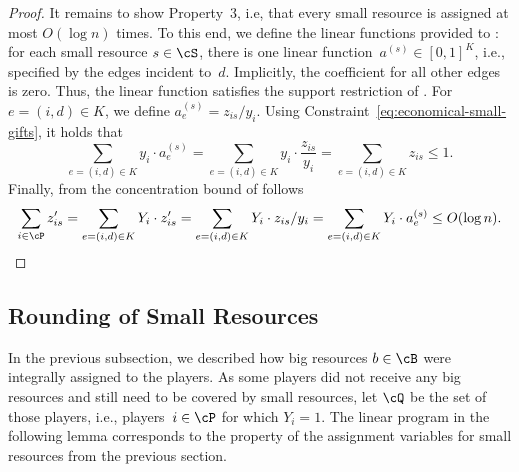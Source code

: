 \documentclass[a4paper,USenglish,cleveref,thm-restate]{lipics-v2021}
\begin{document}
\begin{proof}
It remains to show Property~3, i.e, that every small resource
is assigned at most $O(\log n)$ times.
To this end, we define the linear functions provided to : 
for each small resource $s\in \cS$,
there is one linear function~$a^{(s)}\in [0,1]^K$,
i.e., specified by the edges incident to~$d$.
Implicitly, the coefficient for all other edges is zero.
Thus,
the linear function satisfies the support restriction of 
.
For $e = (i, d) \in K$, we define
$a^{(s)}_e = z_{is} / y_i$.
Using Constraint~\eqref{eq:economical-small-gifts}, it holds that
\begin{equation*}
\sum_{e = (i, d) \in K} y_i \cdot a^{(s)}_e = 
\sum_{e = (i, d) \in K} y_i \cdot \frac{z_{is}}{y_i} = 
\sum_{e = (i, d) \in K} z_{is} \le 1 . 
\end{equation*}
Finally, from the concentration bound of  follows
\begin{equation*}
\sum_{i\in \cP} z'_{is}
= \sum_{e = (i, d) \in K} Y_i \cdot z'_{is}
= \sum_{e = (i, d) \in K} Y_i \cdot z_{is} / y_i
= \sum_{e = (i, d) \in K} Y_i \cdot a^{(s)}_e \le O(\log n) . \qedhere
\end{equation*}
\end{proof}

\subsection{Rounding of Small Resources}
\label{sec:rounding-of-small-items}
In the previous subsection, we described how big resources $b \in \cB$ were integrally assigned to the players.
As some players did not receive any big resources and still need to be covered by small resources, let
$\cQ$ be the set of those players, i.e., players~$i\in\cP$ 
for which $Y_i = 1$. The linear program in the following lemma
corresponds to the property of the assignment variables
for small resources from the previous section.
\end{document}

